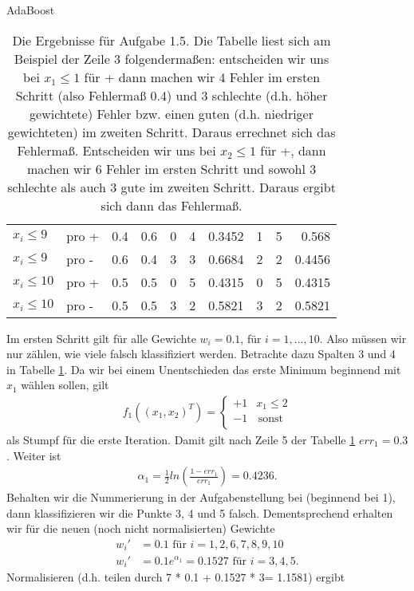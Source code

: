 \begin{task}[credit=15]{AdaBoost}
\begin{subtask}[title=Algorithmus,points=12]
\begin{solution}
\begin{table}[h]
\begin{tabular}{ll|rr|rrrrrr}
		$x_i \leq 9$ & pro + & 0.4 & 0.6 & 0 &4 &0.3452 & 1 &5& 0.568 \\
		$x_i \leq 9$ & pro - & 0.6 & 0.4 & 3 &3 & 0.6684 & 2 &2 & 0.4456 \\
		
		$x_i \leq 10$ & pro + & 0.5 & 0.5 & 0 &5 & 0.4315 & 0 &5 & 0.4315 \\
		$x_i \leq 10$ & pro - & 0.5 & 0.5 & 3 &2 & 0.5821 & 3 &2 & 0.5821 \\
		
	\end{tabular}
	\caption{Die Ergebnisse für Aufgabe 1.5. Die Tabelle liest sich am Beispiel der Zeile 3 folgendermaßen: entscheiden wir uns bei $x_1 \leq 1$ für + dann machen wir 4 Fehler im ersten Schritt (also Fehlermaß 0.4) und 3 schlechte (d.h. höher gewichtete) Fehler bzw. einen guten (d.h. niedriger gewichteten) im zweiten Schritt. Daraus errechnet sich das Fehlermaß. Entscheiden wir uns bei $x_2 \leq 1$ für +, dann machen wir 6 Fehler im ersten Schritt und sowohl 3 schlechte als auch 3 gute im zweiten Schritt. Daraus ergibt sich dann das Fehlermaß.  }
	\label{tab:H1.5-Ergebnis}
\end{table}	
Im ersten Schritt gilt für alle Gewichte $w_i = 0.1$, für $i = 1, \ldots, 10$. Also müssen wir nur zählen, wie viele falsch klassifiziert werden. Betrachte dazu Spalten 3 und 4 in Tabelle \ref{tab:H1.5-Ergebnis}. Da wir bei einem Unentschieden das erste Minimum beginnend mit $x_1$ wählen sollen, gilt \begin{align*}
f_1 ((x_1, x_2)^T) = \left\{
\begin{array}{ll}
+1 & x_1 \leq 2 \\
-1 & \, \textrm{sonst} \\
\end{array}
\right. 
\end{align*} als Stumpf für die erste Iteration. Damit gilt nach Zeile 5 der Tabelle \ref{tab:H1.5-Ergebnis} $err_1 = 0.3$. Weiter ist \begin{align*}
\alpha_1 = \frac{1}{2}ln(\frac{1-err_1}{err_1}) = 0.4236.
\end{align*} Behalten wir die Nummerierung in der Aufgabenstellung bei (beginnend bei 1), dann klassifizieren wir die Punkte 3, 4 und 5 falsch. Dementsprechend erhalten wir für die neuen (noch nicht normalisierten) Gewichte \begin{align*}
w_i' &= 0.1 \text{ für } i = 1,2,6,7,8,9,10 \\
w_i' &= 0.1e^{\alpha_1} = 0.1527 \text{ für } i = 3,4,5.
\end{align*} Normalisieren (d.h. teilen durch 7 * 0.1 + 0.1527 * 3= 1.1581) ergibt \begin{align*}

\end{align*}
\end{solution}
\end{subtask}
\end{task}
